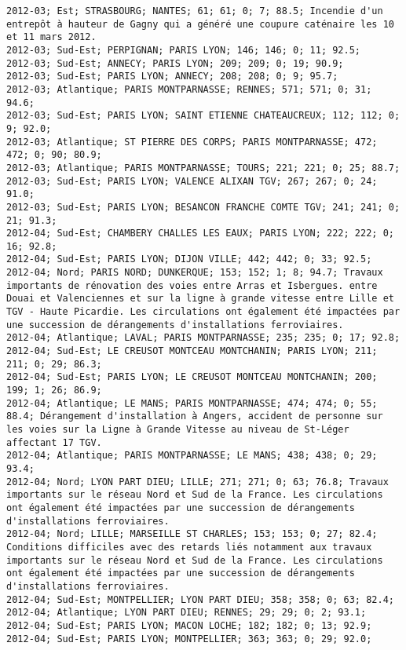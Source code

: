 \documentclass{article}
\begin{document}
\begin{Verbatim}[commandchars=\\\{\}]
2012-03; Est; STRASBOURG; NANTES; 61; 61; 0; 7; 88.5; Incendie d'un entrepôt à hauteur de Gagny qui a généré une coupure caténaire les 10 et 11 mars 2012.
2012-03; Sud-Est; PERPIGNAN; PARIS LYON; 146; 146; 0; 11; 92.5; 
2012-03; Sud-Est; ANNECY; PARIS LYON; 209; 209; 0; 19; 90.9; 
2012-03; Sud-Est; PARIS LYON; ANNECY; 208; 208; 0; 9; 95.7; 
2012-03; Atlantique; PARIS MONTPARNASSE; RENNES; 571; 571; 0; 31; 94.6; 
2012-03; Sud-Est; PARIS LYON; SAINT ETIENNE CHATEAUCREUX; 112; 112; 0; 9; 92.0; 
2012-03; Atlantique; ST PIERRE DES CORPS; PARIS MONTPARNASSE; 472; 472; 0; 90; 80.9; 
2012-03; Atlantique; PARIS MONTPARNASSE; TOURS; 221; 221; 0; 25; 88.7; 
2012-03; Sud-Est; PARIS LYON; VALENCE ALIXAN TGV; 267; 267; 0; 24; 91.0; 
2012-03; Sud-Est; PARIS LYON; BESANCON FRANCHE COMTE TGV; 241; 241; 0; 21; 91.3; 
2012-04; Sud-Est; CHAMBERY CHALLES LES EAUX; PARIS LYON; 222; 222; 0; 16; 92.8; 
2012-04; Sud-Est; PARIS LYON; DIJON VILLE; 442; 442; 0; 33; 92.5; 
2012-04; Nord; PARIS NORD; DUNKERQUE; 153; 152; 1; 8; 94.7; Travaux importants de rénovation des voies entre Arras et Isbergues. entre Douai et Valenciennes et sur la ligne à grande vitesse entre Lille et TGV - Haute Picardie. Les circulations ont également été impactées par une succession de dérangements d'installations ferroviaires.
2012-04; Atlantique; LAVAL; PARIS MONTPARNASSE; 235; 235; 0; 17; 92.8; 
2012-04; Sud-Est; LE CREUSOT MONTCEAU MONTCHANIN; PARIS LYON; 211; 211; 0; 29; 86.3; 
2012-04; Sud-Est; PARIS LYON; LE CREUSOT MONTCEAU MONTCHANIN; 200; 199; 1; 26; 86.9; 
2012-04; Atlantique; LE MANS; PARIS MONTPARNASSE; 474; 474; 0; 55; 88.4; Dérangement d'installation à Angers, accident de personne sur les voies sur la Ligne à Grande Vitesse au niveau de St-Léger affectant 17 TGV.
2012-04; Atlantique; PARIS MONTPARNASSE; LE MANS; 438; 438; 0; 29; 93.4; 
2012-04; Nord; LYON PART DIEU; LILLE; 271; 271; 0; 63; 76.8; Travaux importants sur le réseau Nord et Sud de la France. Les circulations ont également été impactées par une succession de dérangements d'installations ferroviaires.
2012-04; Nord; LILLE; MARSEILLE ST CHARLES; 153; 153; 0; 27; 82.4; Conditions difficiles avec des retards liés notamment aux travaux importants sur le réseau Nord et Sud de la France. Les circulations ont également été impactées par une succession de dérangements d'installations ferroviaires.
2012-04; Sud-Est; MONTPELLIER; LYON PART DIEU; 358; 358; 0; 63; 82.4; 
2012-04; Atlantique; LYON PART DIEU; RENNES; 29; 29; 0; 2; 93.1; 
2012-04; Sud-Est; PARIS LYON; MACON LOCHE; 182; 182; 0; 13; 92.9; 
2012-04; Sud-Est; PARIS LYON; MONTPELLIER; 363; 363; 0; 29; 92.0; 

\end{Verbatim}
\end{document}
